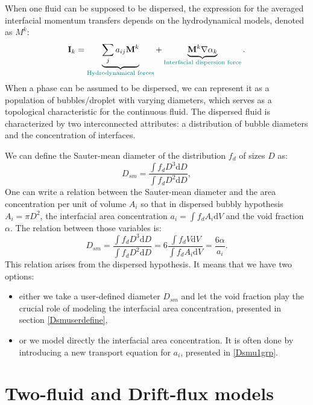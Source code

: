 When one fluid can be supposed to be dispersed, the expression for the averaged interfacial momentum transfers depends on the hydrodynamical models, denoted as $M^k$: 
\begin{equation}
\mathbf{I}_k=\underbrace{\sum_j a_{ij}\mathbf{M}^k}_{\color{myteal}\text{Hydrodynamical forces}} +  \underbrace{\mathbf{M}^k\nabla \alpha_k}_{\color{myteal}\text{Interfacial dispersion force}}.
\end{equation}
When a phase can be assumed to be dispersed, we can represent it as a population of bubbles/droplet with varying diameters, which serves as a topological characteristic for the continuous fluid. The dispersed fluid is characterized by two interconnected attributes: a distribution of bubble diameters and the concentration of interfaces.

We can define the Sauter-mean diameter of the distribution $f_d$ of sizes $D$ as:
\begin{equation}
    D_{sm} = \frac{\int f_d D^3 \mathrm{d}D}{\int f_d D^2 \mathrm{d}D},
\end{equation}
One can write a relation between the Sauter-mean diameter and the area concentration per unit of volume $A_i$ so that in dispersed bubbly hypothesis $A_i=\pi D^2$, the interfacial area concentration $a_i=\int f_d A_i \mathrm{d}V$ and the void fraction $\alpha$. The relation between those variables is:
\begin{equation}\label{eq:disphypo}
    D_{sm} = \frac{\int f_d D^3 \mathrm{d}D}{\int f_d D^2 \mathrm{d}D} = 6\frac{\int f_d V \mathrm{d}V}{\int f_d A_i \mathrm{d}V} = \frac{6\alpha}{a_i}.
\end{equation}
This relation arises from the dispersed hypothesis. It means that we have two options:
\begin{itemize}
  \item[\small \textcolor{blue}{\ding{109}}] either we take a user-defined diameter $D_{sm}$ and let the void fraction play the crucial role of modeling the interfacial area concentration, presented in section \ref{Dsmuserdefine},
  \item[\small \textcolor{blue}{\ding{109}}] or we model directly the interfacial area concentration. It is often done by introducing a new transport equation for $a_i$, presented in \ref{Dsmu1grp}.
\end{itemize}

\section{Two-fluid and Drift-flux models\label{sec:two-fluid-drift}}

